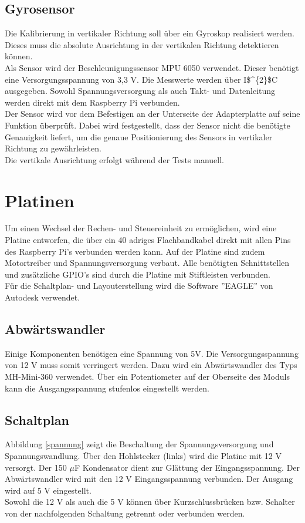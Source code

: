 \subsection{Gyrosensor}
Die Kalibrierung in vertikaler Richtung soll über ein Gyroskop realisiert werden. Dieses muss die absolute Ausrichtung in der vertikalen Richtung detektieren können. \\ 
Als Sensor wird der Beschleunigungssensor MPU 6050 verwendet. Dieser benötigt eine Versorgungsspannung von 3,3 V. Die Messwerte werden über \ac{I$^{2}$C} ausgegeben.\cite{MPU-6050} Sowohl Spannungsversorgung als auch Takt- und Datenleitung werden direkt mit dem Raspberry Pi verbunden. \\ 
Der Sensor wird vor dem Befestigen an der Unterseite der Adapterplatte auf seine Funktion überprüft. Dabei wird festgestellt, dass der Sensor nicht die benötigte Genauigkeit liefert, um die genaue Positionierung des Sensors in vertikaler Richtung zu gewährleisten. \\
Die vertikale Ausrichtung erfolgt während der Tests manuell.


\section{Platinen}

Um einen Wechsel der Rechen- und Steuereinheit zu ermöglichen, wird eine Platine entworfen, die über ein 40 adriges Flachbandkabel direkt mit allen Pins des Raspberry Pi's verbunden werden kann. Auf der Platine sind zudem Motortreiber und Spannungsversorgung verbaut. Alle benötigten Schnittstellen und zusätzliche \ac{GPIO}’s sind durch die Platine mit Stiftleisten verbunden.\\
Für die Schaltplan- und Layouterstellung wird die Software ''EAGLE'' von Autodesk verwendet.


\subsection{Abwärtswandler} 

Einige Komponenten benötigen eine Spannung von 5V. Die Versorgungsspannung von 12 V muss somit verringert werden. Dazu wird ein Abwärtswandler des Typs MH-Mini-360 verwendet. Über ein Potentiometer auf der Oberseite des Moduls kann die Ausgangsspannung stufenlos eingestellt werden.

\subsection{Schaltplan} \label{sec:Schaltplan} 
Abbildung \ref{spannung} zeigt die Beschaltung der Spannungsversorgung und Spannungswandlung. Über den Hohlstecker (links) wird die Platine mit 12 V versorgt. Der 150 $\mu$F Kondensator dient zur Glättung der Eingangsspannung. Der Abwärtswandler wird mit den 12 V Eingangsspannung verbunden. Der Ausgang wird auf 5 V eingestellt. \\
Sowohl die 12 V als auch die 5 V können über Kurzschlussbrücken bzw. Schalter von der nachfolgenden Schaltung getrennt oder verbunden werden.    

